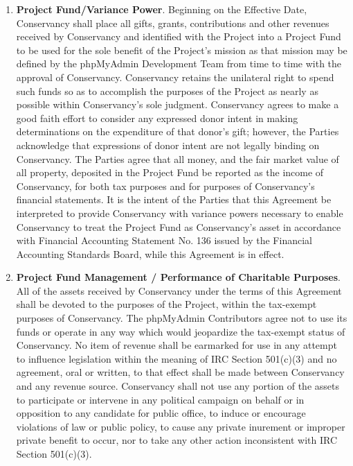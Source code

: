 \documentclass[letterpaper,12pt]{article}
\newcommand{\signatories}{phpMyAdmin Contributors\xspace}
\newcommand{\leadershipbody}{phpMyAdmin Development Team\xspace}
\begin{document}
\begin{enumerate}[label=\arabic*.,ref=\S~\arabic*]
Notwithstanding the above, the \signatories agree that should Conservancy
be required to pay any taxes (including but not limited to sales taxes
and unrelated business taxable income) as the result of any activity
of the Project and/or activities undertaken by Conservancy on the
Project's behalf, such taxes shall be deducted from the Project Fund.


Conservancy will monitor any unrelated business taxable income and
may require the Project to cease activities generating such income
if the overall amounts exceed amounts permissible or prudent for Conservancy,
given Conservancy's tax exempt status.

\item \textbf{Project Fund/Variance Power}. Beginning on the Effective Date,
Conservancy shall place all gifts, grants, contributions and other
revenues received by Conservancy and identified with the Project into
a Project Fund to be used for the sole benefit of the Project's mission
as that mission may be defined by the \leadershipbody from
time to time with the approval of Conservancy. Conservancy retains
the unilateral right to spend such funds so as to accomplish the purposes
of the Project as nearly as possible within Conservancy's sole judgment.
Conservancy agrees to make a good faith effort to consider any expressed
donor intent in making determinations on the expenditure of that donor's
gift; however, the Parties acknowledge that expressions of donor intent
are not legally binding on Conservancy. The Parties agree that all
money, and the fair market value of all property, deposited in the
Project Fund be reported as the income of Conservancy, for both tax
purposes and for purposes of Conservancy's financial statements. It
is the intent of the Parties that this Agreement be interpreted to
provide Conservancy with variance powers necessary to enable Conservancy
to treat the Project Fund as Conservancy's asset in accordance with
Financial Accounting Statement No. 136 issued by the Financial Accounting
Standards Board, while this Agreement is in effect. 
\item \textbf{Project Fund Management / Performance of Charitable Purposes}.
\label{CharitablePurpose} All of the assets received by Conservancy
under the terms of this Agreement shall be devoted to the purposes
of the Project, within the tax-exempt purposes of Conservancy. The
\signatories agree not to use its funds or operate in any way which would
jeopardize the tax-exempt status of Conservancy. No item of revenue
shall be earmarked for use in any attempt to influence legislation
within the meaning of IRC Section 501(c)(3) and no agreement, oral
or written, to that effect shall be made between Conservancy and any
revenue source. Conservancy shall not use any portion of the assets
to participate or intervene in any political campaign on behalf or
in opposition to any candidate for public office, to induce or encourage
violations of law or public policy, to cause any private inurement
or improper private benefit to occur, nor to take any other action
inconsistent with IRC Section 501(c)(3). 


\end{enumerate}
\end{document}
